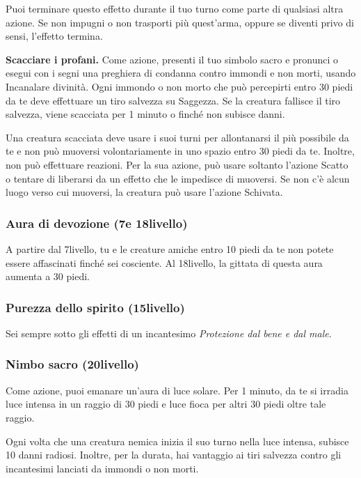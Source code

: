 \documentclass[a4paper,10pt,twoside,twocolumn,openany,bg=full,nodeprecatedcode]{dndbook}
\begin{document}
Puoi terminare questo effetto durante il tuo turno come parte di qualsiasi altra azione.
Se non impugni o non trasporti più quest'arma, oppure se diventi privo di sensi, l'effetto termina.

\textbf{Scacciare i profani.} Come azione, presenti il tuo simbolo sacro e pronunci o esegui con i segni una preghiera di condanna contro immondi e non morti, usando Incanalare divinità.
Ogni immondo o non morto che può percepirti entro 30 piedi da te deve effettuare un tiro salvezza su Saggezza.
Se la creatura fallisce il tiro salvezza, viene scacciata per 1 minuto o finché non subisce danni.

Una creatura scacciata deve usare i suoi turni per allontanarsi il più possibile da te e non può muoversi volontariamente in uno spazio entro 30 piedi da te.
Inoltre, non può effettuare reazioni.
Per la sua azione, può usare soltanto l'azione Scatto o tentare di liberarsi da un effetto che le impedisce di muoversi.
Se non c'è alcun luogo verso cui muoversi, la creatura può usare l'azione Schivata.

\subsubsection{Aura di devozione (7\degree e 18\degree livello)}

A partire dal 7\degree livello, tu e le creature amiche entro 10 piedi da te non potete essere affascinati finché sei cosciente.
Al 18\degree livello, la gittata di questa aura aumenta a 30 piedi.

\subsubsection{Purezza dello spirito (15\degree livello)}

Sei sempre sotto gli effetti di un incantesimo \emph{Protezione dal bene e dal male}.

\subsubsection{Nimbo sacro (20\degree livello)}

Come azione, puoi emanare un'aura di luce solare.
Per 1 minuto, da te si irradia luce intensa in un raggio di 30 piedi e luce fioca per altri 30 piedi oltre tale raggio.

Ogni volta che una creatura nemica inizia il suo turno nella luce intensa, subisce 10 danni radiosi.
Inoltre, per la durata, hai vantaggio ai tiri salvezza contro gli incantesimi lanciati da immondi o non morti.
\end{document}
